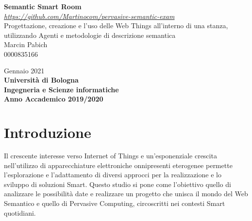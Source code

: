 \documentclass[12pt,a4paper,openright,oneside]{report}
\begin{document}
\begin{titlepage}
	\begin{center}
		
		\vspace*{40mm}
		{\Large{\textbf{Semantic Smart Room}}}\\
		
		\vspace*{4mm}
		{\small{\textit{\url{https://github.com/Martinocom/pervasive-semantic-exam}}}}\\
		
		\vspace*{4mm}
		{\Large{Progettazione, creazione e l'uso delle Web Things all'interno di una stanza, utilizzando Agenti e metodologie di descrizione semantica}}\\
		
		\vspace{10mm}
		{\Large{Marcin Pabich\\}}
		{\large{0000835166}}
		
		\vspace{10mm}
		{\large{Gennaio 2021}}\\
		
		\vspace{20mm}
		{\large{\bf Università di Bologna}}\\
		\vspace{1mm}
		{\large{\bf Ingegneria e Scienze informatiche}}\\
		\vspace{1mm}
		{\large{\bf Anno Accademico 2019/2020}}
		\vspace*{\fill}
	\end{center}
\end{titlepage}
\tableofcontents                        %
\clearpage{\pagestyle{empty}\cleardoublepage}
\listoffigures                          %
\clearpage{\pagestyle{empty}\cleardoublepage}
\lstlistoflistings						%

\clearpage{\pagestyle{empty}\cleardoublepage}
\chapter{Introduzione}
Il crescente interesse verso Internet of Things e un'esponenziale crescita nell'utilizzo di apparecchiature elettroniche onnipresenti eterogenee permette l'esplorazione e l'adattamento di diversi approcci per la realizzazione e lo sviluppo di soluzioni Smart. Questo studio si pone come l'obiettivo quello di analizzare le possibilità date e realizzare un progetto che unisca il mondo del Web Semantico e quello di Pervasive Computing, circoscritti nei contesti Smart quotidiani.\\
\end{document}

